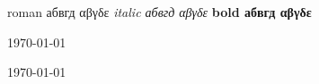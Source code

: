 \documentclass{article}
\begin{document}
roman абвгд αβγδε \textit{italic абвгд αβγδε} \textbf{bold абвгд
αβγδε}


\chaptername{} \today

\selectfont


\chaptername{} {  \today}
\end{document}
